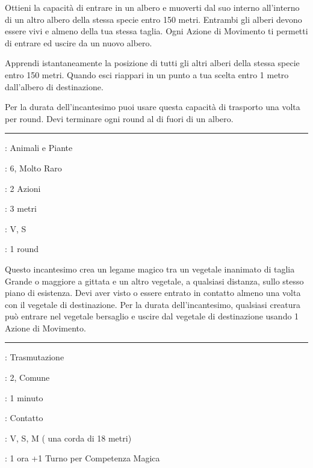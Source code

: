 \begin{multicols}{2}
Ottieni la capacità di entrare in un albero e muoverti dal suo interno all'interno di un altro albero della stessa specie entro 150 metri. Entrambi gli alberi devono essere vivi e almeno della tua stessa taglia. Ogni Azione di Movimento ti permetti di entrare ed uscire da un nuovo albero.

Apprendi istantaneamente la posizione di tutti gli altri alberi della stessa specie entro 150 metri. Quando esci riappari in un punto a tua scelta entro 1 metro dall'albero di destinazione.

Per la durata dell'incantesimo puoi usare questa capacità di trasporto una volta per round. Devi terminare ogni round al di fuori di un albero.

\smallskip\noindent\rule{\linewidth}{2pt} \hypertarget{Trasporto Vegetale}{}\medskip{}
\noindent
\begin{description}[noitemsep, topsep=0pt, parsep=0pt, partopsep=0pt, leftmargin=0cm, labelwidth=2.8cm]
	\item[\textbf{Lista di Magia}]: Animali e Piante
	\item[\textbf{Livello}]: 6, Molto Raro
	\item[\textbf{T. di Lancio}]: 2 Azioni
	\item[\textbf{Gittata}]: 3 metri
	\item[\textbf{Componenti}]: V, S
	\item[\textbf{Durata}]: 1 round
\end{description}

Questo incantesimo crea un legame magico tra un vegetale inanimato di taglia Grande o maggiore a gittata e un altro vegetale, a qualsiasi distanza, sullo stesso piano di esistenza. Devi aver visto o essere entrato in contatto almeno una volta con il vegetale di destinazione. Per la durata dell'incantesimo, qualsiasi creatura può entrare nel vegetale bersaglio e uscire dal vegetale di destinazione usando 1 Azione di Movimento.

\smallskip\noindent\rule{\linewidth}{2pt} \hypertarget{Trucco della Corda}{}\medskip{}
\noindent
\begin{description}[noitemsep, topsep=0pt, parsep=0pt, partopsep=0pt, leftmargin=0cm, labelwidth=2.8cm]
	\item[\textbf{Lista di Magia}]: Trasmutazione
	\item[\textbf{Livello}]: 2, Comune
	\item[\textbf{T. di Lancio}]: 1 minuto
	\item[\textbf{Gittata}]: Contatto
	\item[\textbf{Componenti}]: V, S, M ( una corda di 18 metri)
	\item[\textbf{Durata}]: 1 ora +1 Turno per Competenza Magica
\end{description}


\end{multicols}
